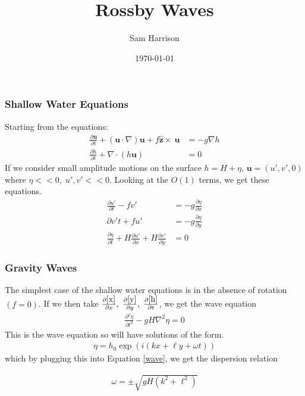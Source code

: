 \documentclass{beamer}
\title{Rossby Waves}
\author{Sam Harrison}
\institute{MPE CDT }
\date{\today}
\renewcommand{\vec}[1]{\mathbf{#1}}
\newcommand{\grad}{\nabla}
\newcommand{\partiald}[2]{\frac{\partial {#1} }{\partial {#2}}}
\begin{document}
 
\frame{\titlepage}
  
\begin{frame}
\frametitle{Shallow Water Equations}
Starting from the equations:
\begin{align}
\frac{\partial \vec{u}}{\partial t}+(\vec{u}\cdot\nabla) \vec{u}+f\vec{\hat{z}}\times\ \vec{u}& =-g\grad h\label{mom}\\
\frac{\partial h}{\partial t}+\grad\cdot(h\vec{u})& =0\label{heq}
\end{align}
If we consider small amplitude motions on the surface $h=H+\eta$, $\vec{u}=(u',v',0)$ where $\eta<<0,\;u',v'<<0$.
Looking at the $O(1)$ terms, we get these equations.
\begin{align}
\partiald{u'}{t}-fv'&=-g\partiald{\eta}{x}\label{x}\\
\partial{v'}{t}+fu'&=-g\partiald{\eta}{y}\label{y}\\
\partiald{\eta}{t}+H\partiald{u'}{x}+H\partiald{v'}{y}&=0 \label{h}
\end{align}
\end{frame}
\begin{frame}
\frametitle{Gravity Waves}
The simplest case of the shallow water equations is in the absence of rotation $(f=0)$. If we then take $\partiald{\eqref{x}}{x},\; \partiald{\eqref{y}}{y},\;\partiald{\eqref{h}}{t}$, we get the wave equation
\begin{align}
\partiald{^2\eta}{t^2}-gH\grad^2\eta=0\label{wave}
\end{align}
This is the wave equation so will have solutions of the form.
\begin{align}
\eta=h_0\exp(i(kx+\ell y+\omega t))\label{wavepacket}
\end{align}
which by plugging this into Equation \eqref{wave}, we get the dispersion relation

\begin{align}
\omega=\pm\sqrt{gH(k^2+\ell^2)}
\end{align}
\end{frame}
\end{document}

